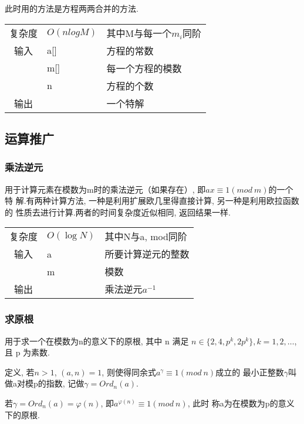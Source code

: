 此时用的方法是方程两两合并的方法.
\begin{longtable}{|c|l|l|}
复杂度 & $O(nlogM)$ & 其中M与每一个$m_i$同阶 \\
输入 & a[] & 方程的常数 \\
 & m[] & 每一个方程的模数 \\
 & n & 方程的个数 \\
输出 & & 一个特解 \\
\end{longtable}



    \subsection{运算推广}\small


        \subsubsection{乘法逆元}\small
用于计算元素在模数为m时的乘法逆元（如果存在）, 即$ax \equiv 1(mod\ m)$的一个特
解.有两种计算方法, 一种是利用扩展欧几里得直接计算, 另一种是利用欧拉函数的
性质去进行计算.两者的时间复杂度近似相同, 返回结果一样.
\begin{longtable}{|c|l|l|}
复杂度 & $O(\log N)$ & 其中N与a, mod同阶  \\
输入 & a & 所要计算逆元的整数 \\
 & m & 模数 \\
输出 &  & 乘法逆元$a^{-1}$ \\
\end{longtable}



        \subsubsection{求原根}\small
用于求一个在模数为n的意义下的原根, 其中 n 满足 $n \in \{2, 4, p^k, 2p^k\}, k=1, 2, \dots$, 且 p 为素数.

定义, 若$n > 1$, $(a, n) = 1$, 则使得同余式$a^{\gamma} \equiv 1(mod\ n)$成立的
最小正整数$\gamma$叫做a对模p的指数, 记做$\gamma = Ord_{n}(a)$.

若$\gamma = Ord_{n}(a) = \varphi(n)$, 即$a^{\varphi(n)} \equiv 1(mod\ n)$, 此时
称a为在模数为p的意义下的原根.

